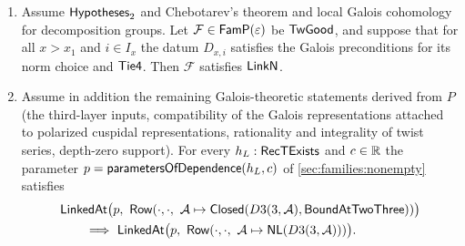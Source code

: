 \begin{theorem}\Fmark\label{thm:linkN}
\begin{enumerate}[label=(\alph*)]
\item Assume $\mathsf{Hypotheses}_2$ and Chebotarev's theorem and local Galois cohomology for decomposition groups.
Let $\mathcal F\in\mathsf{FamP}(\varepsilon)$ be $\mathsf{TwGood}$, and suppose that for all $x>x_1$ and $i\in I_x$ the
datum $D_{x,i}$ satisfies the Galois preconditions for its norm choice and $\mathsf{Tie4}$. Then
$\mathcal F$ satisfies $\mathsf{LinkN}$.
\item Assume in addition the remaining Galois-theoretic statements derived from $P$ (the third-layer inputs,
compatibility of the Galois representations attached to polarized cuspidal representations, rationality and
integrality of twist series, depth-zero support). For
every $h_L:\mathsf{RecTExists}$ and $c\in\mathbb{R}$ the parameter $p=\mathsf{parametersOfDependence}(h_L,c)$ of
\cref{sec:families:nonempty} satisfies
\[
\begin{aligned}
&\mathsf{LinkedAt}\bigl(p,\ \mathsf{Row}(\cdot,\cdot,\ \mathcal A\mapsto\mathsf{Closed}(D3(3,\mathcal A),
\mathsf{BoundAtTwoThree}))\bigr)\\
&\qquad\Longrightarrow\
\mathsf{LinkedAt}\bigl(p,\ \mathsf{Row}(\cdot,\cdot,\ \mathcal A\mapsto\mathsf{NL}(D3(3,\mathcal A)))\bigr).
\end{aligned}
\]
\end{enumerate}
\end{theorem}

